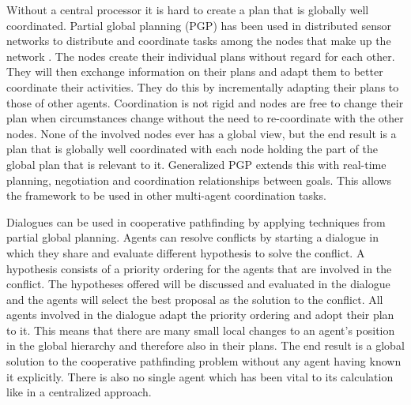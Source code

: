 Without a central processor it is hard to create a plan that is globally well
coordinated. Partial global planning (PGP) has been used in distributed sensor
networks to distribute and coordinate tasks among the nodes that make up the
network \cite[pp.~202--204]{durfee1991,woodridge2009}. The nodes create their 
individual plans without
regard for each other. They will then exchange information on their plans and
adapt them to better coordinate their activities. They do this by incrementally 
adapting their plans to those of other agents. Coordination is not rigid and
nodes are free to change their plan when circumstances change without the need 
to re-coordinate with the other nodes. None of the involved nodes ever has a 
global view, but the end result is a plan that is globally well
coordinated with each node holding the part of the global plan that is relevant
to it. Generalized PGP \cite{decker1992} extends this with real-time planning, 
negotiation and coordination relationships between goals. This allows the 
framework to be used in other multi-agent coordination tasks.

Dialogues can be used in cooperative pathfinding by applying techniques from
partial global planning. Agents can resolve conflicts by starting a dialogue in
which they share and evaluate different hypothesis to solve the conflict. A
hypothesis consists of a priority ordering for the agents that are involved in
the conflict. The hypotheses offered will be discussed and evaluated in the
dialogue and the agents will select the best proposal as the solution
to the conflict. All agents involved in the dialogue adapt the priority
ordering and adopt their plan to it. This means that there are many small local
changes to an agent's position in the global hierarchy and therefore also in
their plans. The end result is a global solution to the cooperative pathfinding
problem without any agent having known it explicitly. There is also no single
agent which has been vital to its calculation like in a centralized approach.
